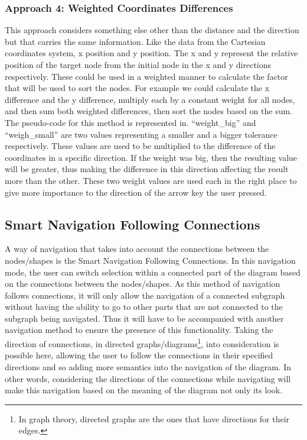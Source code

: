 \subsubsection{Approach 4: Weighted Coordinates Differences}
This approach considers something else other than the distance and the direction but that carries the same information. Like the data from the Cartesian coordinates system, x position and y position. The x and y represent the relative position of the target node from the initial node in the x and y directions respectively. These could be used in a weighted manner to calculate the factor that will be used to sort the nodes. For example we could calculate the x difference and the y difference, multiply each by a constant weight for all nodes, and then sum both weighted differences, then sort the nodes based on the sum. The pseudo-code for this method is represented in. ``weight\_big'' and ``weigh\_small'' are two values representing a smaller and a bigger tolerance respectively. These values are used to be multiplied to the difference of the coordinates in a specific direction. If the weight was big, then the resulting value will be greater, thus making the difference in this direction affecting the result more than the other. These two weight values are used each in the right place to give more importance to the direction of the arrow key the user pressed.


\subsection{Smart Navigation Following Connections}
A way of navigation that takes into account the connections between the nodes/shapes is the Smart Navigation Following Connections.
In this navigation mode, the user can switch selection within a connected part of the diagram based on the connections between the nodes/shapes. As this method of navigation follows connections, it will only allow the navigation of a connected subgraph without having the ability to go to other parts that are not connected to the subgraph being navigated. Thus it will have to be accompanied with another navigation method to ensure the presence of this functionality. Taking the direction of connections, in directed graphs/diagrams\footnote{In graph theory, directed graphs are the ones that have directions for their edges.}, into consideration is possible here, allowing the user to follow the connections in their specified directions and so adding more semantics into the navigation of the diagram. In other words, considering the directions of the connections while navigating will make this navigation based on the meaning of the diagram not only its look.

